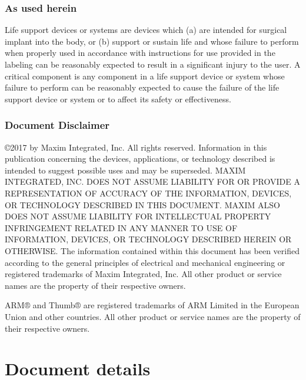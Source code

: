 \documentclass[twoside]{book}
\newcommand\docyear{2017 }
\newcommand{\+}{\discretionary{\mbox{\scriptsize$\hookleftarrow$}}{}{}}
\newcommand{\clearemptydoublepage}{%
  \newpage{\pagestyle{empty}\cleardoublepage}%
}
\let\cleardoublepage\clearpage
\begin{document}
\subsection*{As used herein}
Life support devices or systems are devices which (a) are intended for surgical implant into the body, or (b) support or sustain life and whose failure to perform when properly used in accordance with instructions for use provided in the labeling can be reasonably expected to result in a significant injury to the user. A critical component is any component in a life support device or system whose failure to perform can be reasonably expected to cause the failure of the life support device or system or to affect its safety or effectiveness.

\subsection*{Document Disclaimer}
©\docyear by Maxim Integrated, Inc. All rights reserved. Information in this publication concerning the devices, applications, or technology described is intended to suggest possible uses and may be superseded. MAXIM INTEGRATED, INC. DOES NOT ASSUME LIABILITY FOR OR PROVIDE A REPRESENTATION OF ACCURACY OF THE INFORMATION, DEVICES, OR TECHNOLOGY DESCRIBED IN THIS DOCUMENT. MAXIM ALSO DOES NOT ASSUME LIABILITY FOR INTELLECTUAL PROPERTY INFRINGEMENT RELATED IN ANY MANNER TO USE OF INFORMATION, DEVICES, OR TECHNOLOGY DESCRIBED HEREIN OR OTHERWISE. The information contained within this document has been verified according to the general principles of electrical and mechanical engineering or registered trademarks of Maxim Integrated, Inc. All other product or service names are the property of their respective owners. 

ARM® and Thumb® are registered trademarks of ARM Limited in the European Union and other countries. All other product or service names are the property of their respective owners.


\clearemptydoublepage
{}
\tableofcontents
\clearemptydoublepage
{}
\hypersetup{pageanchor=true}


\chapter{Document details}


\end{document}
